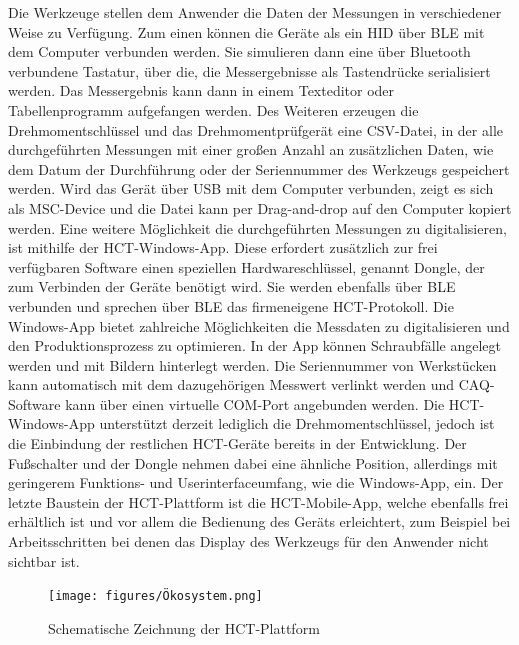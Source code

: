 Die Werkzeuge stellen dem Anwender die Daten der Messungen in verschiedener Weise zu Verfügung. Zum einen können die Geräte als ein \ac{HID} über \ac{BLE} mit dem Computer verbunden werden. Sie simulieren dann eine über Bluetooth verbundene Tastatur, über die, die Messergebnisse als Tastendrücke serialisiert werden. Das Messergebnis kann dann in einem Texteditor oder Tabellenprogramm aufgefangen werden. Des Weiteren erzeugen die Drehmomentschlüssel und das Drehmomentprüfgerät eine \ac{CSV}-Datei, in der alle durchgeführten Messungen mit einer großen Anzahl an zusätzlichen Daten, wie dem Datum der Durchführung oder der Seriennummer des Werkzeugs gespeichert werden. Wird das Gerät über \ac{USB} mit dem Computer verbunden, zeigt es sich als \ac{MSC}-Device und die Datei kann per Drag-and-drop auf den Computer kopiert werden. Eine weitere Möglichkeit die durchgeführten Messungen zu digitalisieren, ist mithilfe der \ac{HCT}-Windows-App. Diese erfordert zusätzlich zur frei verfügbaren Software einen speziellen Hardwareschlüssel, genannt Dongle, der zum Verbinden der Geräte benötigt wird. Sie werden ebenfalls über \ac{BLE} verbunden und sprechen über \ac{BLE} das firmeneigene \ac{HCT}-Protokoll. Die Windows-App bietet zahlreiche Möglichkeiten die Messdaten zu digitalisieren und den Produktionsprozess zu optimieren. In der App können Schraubfälle angelegt werden und mit Bildern hinterlegt werden. Die Seriennummer von Werkstücken kann automatisch mit dem dazugehörigen Messwert verlinkt werden und \ac{CAQ}-Software kann über einen virtuelle COM-Port angebunden werden. Die \ac{HCT}-Windows-App unterstützt derzeit lediglich die Drehmomentschlüssel, jedoch ist die Einbindung der restlichen \ac{HCT}-Geräte bereits in der Entwicklung. Der Fußschalter und der Dongle nehmen dabei eine ähnliche Position, allerdings mit geringerem Funktions- und Userinterfaceumfang, wie die Windows-App, ein. Der letzte Baustein der \ac{HCT}-Plattform ist die \ac{HCT}-Mobile-App, welche ebenfalls frei erhältlich ist und vor allem die Bedienung des Geräts erleichtert, zum Beispiel bei Arbeitsschritten bei denen das Display des Werkzeugs für den Anwender nicht sichtbar ist.

\begin{figure}[H] 
	\centering
	\texttt{[image: figures/Ökosystem.png]}
	\caption{Schematische Zeichnung der \ac{HCT}-Plattform}
\end{figure}


